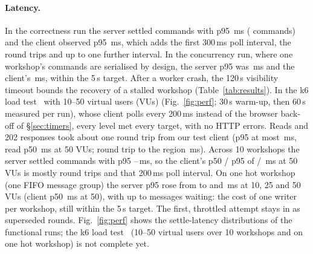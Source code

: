 \paragraph{Latency.}
In the correctness run the server settled commands with p95 \CorrectnessSettleServerPNinetyFiveMs\,ms
(\CorrectnessSettleClientN{} commands) and the client observed p95
\CorrectnessSettleClientPNinetyFiveMs\,ms, which adds the first 300\,ms poll interval, the round
trips and up to one further interval. In the concurrency run, where one workshop's commands are
serialised by design, the server p95 was \ConcurrencySettleServerPNinetyFiveMs\,ms and the client's
\ConcurrencySettleClientPNinetyFiveMs\,ms, within the 5\,s target. After a worker crash, the 120\,s visibility timeout bounds
the recovery of a stalled workshop (Table~\ref{tab:results}).
\ifloadtest In the k6 load test~\cite{k6} with 10--50 virtual users (VUs) (Fig.~\ref{fig:perf};
30\,s warm-up, then 60\,s measured per run), whose client polls every 200\,ms instead of the
browser back-off of \S\ref{sec:timers}, every level met every target, with no HTTP errors. Reads
and 202 responses took about one round trip from our test client (p95 at most
\PerfDevCrossVUTenAcceptPNinetyFiveMs\,ms, read p50 \PerfDevCrossVUFiftyReadPFiftyMs\,ms at 50 VUs;
round trip to the region \ExpiryRaceRttMs\,ms). Across 10 workshops the server settled
commands with p95 \PerfDevCrossVUTenServerSettlePNinetyFiveMs--\PerfDevCrossVUFiftyServerSettlePNinetyFiveMs\,ms,
so the client's p50 / p95 of \PerfDevCrossVUFiftySettlePFiftyMs{} / \PerfDevCrossVUFiftySettlePNinetyFiveMs\,ms
at 50 VUs is mostly round trips and that 200\,ms poll interval. On one hot workshop (one FIFO
message group) the server p95 rose from \PerfDevHotspotVUTenServerSettlePNinetyFiveMs{} to
\PerfDevHotspotVUTwentyFiveServerSettlePNinetyFiveMs{} and
\PerfDevHotspotVUFiftyServerSettlePNinetyFiveMs\,ms at 10, 25 and 50 VUs (client p50
\PerfDevHotspotVUFiftySettlePFiftyMs\,ms at 50), with up to \PerfDevHotspotVUFiftyQueueDepthMax{}
messages waiting: the cost of one writer per workshop, still within the 5\,s target. The first,
throttled attempt stays in  as superseded rounds.
\else Fig.~\ref{fig:perf} shows the settle-latency distributions of the functional runs; the k6 load
test~\cite{k6} (10--50 virtual users over 10 workshops and on one hot workshop) is not complete yet.\fi{}

